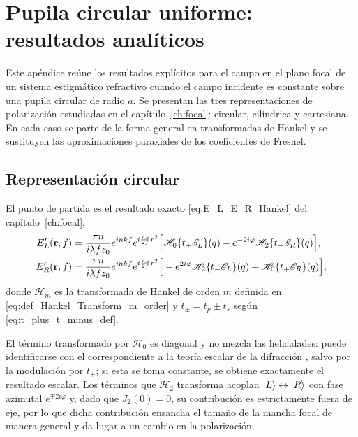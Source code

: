 \chapter{Pupila circular uniforme: resultados analíticos}
\label{apx:focal_forms}

Este apéndice reúne los resultados explícitos para el campo en el plano focal de un sistema estigmático refractivo cuando el campo incidente es constante sobre una pupila circular de radio $a$. Se presentan las tres representaciones de polarización estudiadas en el capítulo~\ref{ch:focal}: circular, cilíndrica y cartesiana. En cada caso se parte de la forma general en transformadas de Hankel y se sustituyen las aproximaciones paraxiales de los coeficientes de Fresnel.

\section{Representación circular}

El punto de partida es el resultado exacto \eqref{eq:E_L_E_R_Hankel} del capítulo~\ref{ch:focal},
\begin{equation}
\begin{aligned}
E'_L(\vb r,f)
&=
\frac{\pi n}{i\lambda f z_0}
e^{inkf}
e^{i\frac{nk}{2f}r^2}
\Big[
\mathscr H_0\{t_+\mathscr E_L\}(q)
-
e^{-2i\varphi}
\mathscr H_2\{t_-\mathscr E_R\}(q)
\Big],
\\
E'_R(\vb r,f)
&=
\frac{\pi n}{i\lambda f z_0}
e^{inkf}
e^{i\frac{nk}{2f}r^2}
\Big[
-e^{2i\varphi} \mathscr H_2\{t_-\mathscr E_L\}(q)
+
\mathscr H_0\{t_+\mathscr E_R\}(q)
\Big],
\end{aligned}
\label{eq:E_L_E_R_Hankel_recall}
\end{equation}
donde $\mathscr H_m$ es la transformada de Hankel de orden $m$ definida en
\eqref{eq:def_Hankel_Transform_m_order} y $t_\pm=t_p\pm t_s$ según
\eqref{eq:t_plus_t_minus_def}.

El término transformado por $\mathscr{H}_0$ es diagonal y no mezcla las helicidades: puede identificarse con el correspondiente a la teoría escalar de la difracción \cite{goodman2005}, salvo por la modulación por $t_+$; si esta se toma constante, se obtiene exactamente el resultado escalar. Los términos que $\mathscr{H}_2$ transforma acoplan $\ket{L}\leftrightarrow\ket{R}$ con fase azimutal $e^{\mp 2i\varphi}$ y, dado que $J_2(0)=0$, su contribución es estrictamente fuera de eje, por lo que dicha contribución ensancha el tamaño de la mancha focal de manera general y da lugar a un cambio en la polarización.

